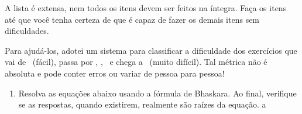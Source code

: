 \documentclass[12pt]{report}
\newcommand{\1}{\faThermometerEmpty}
\newcommand{\2}{\faThermometerQuarter}
\newcommand{\3}{\faThermometerHalf}
\newcommand{\4}{\faThermometerThreeQuarters}
\newcommand{\5}{\faThermometerFull}
\begin{document}
A lista é extensa, nem todos os itens devem ser feitos na íntegra. Faça os itens até que você tenha certeza de que é capaz de fazer os demais itens sem dificuldades. 

Para ajudá-los, adotei um sistema para classificar a dificuldade dos exercícios que vai de \1 \ (fácil), passa por \2 , \3 , \4 \ e chega a \5 \ (muito difícil). Tal métrica não é absoluta e pode conter erros ou variar de pessoa para pessoa!

\vspace{5mm}

\begin{enumerate}
\item Resolva as equações abaixo usando a fórmula de Bhaskara. Ao final, verifique se as respostas, quando existirem, realmente são raízes da equação. \1 a \3


\end{enumerate}
\end{document}
